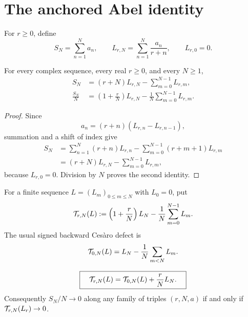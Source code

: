 \section{The anchored Abel identity}
\label{sec:anchored-identity}

\begin{definition}
\label{def:translated-primitive}
For \(r\ge0\), define
\[
 S_N=\sum_{n=1}^Na_n,\qquad
 L_{r,N}=\sum_{n=1}^N\frac{a_n}{r+n},
 \qquad L_{r,0}=0.
\]
\end{definition}

\begin{theorem}
\label{thm:anchored-identity}
For every complex sequence, every real \(r\ge0\), and every
\(N\ge1\),
\begin{align}
 S_N
 &=(r+N)L_{r,N}-\sum_{m=0}^{N-1}L_{r,m},
 \label{eq:anchored-abel}\\
 \frac{S_N}{N}
 &=
 \left(1+\frac rN\right)L_{r,N}
 -\frac1N\sum_{m=0}^{N-1}L_{r,m}.
 \label{eq:anchored-defect-identity}
\end{align}
\end{theorem}

\begin{proof}
Since
\[
 a_n=(r+n)(L_{r,n}-L_{r,n-1}),
\]
summation and a shift of index give
\begin{align*}
 S_N
 &=
 \sum_{n=1}^N(r+n)L_{r,n}
 -\sum_{m=0}^{N-1}(r+m+1)L_{r,m}\\
 &=(r+N)L_{r,N}-\sum_{m=0}^{N-1}L_{r,m},
\end{align*}
because \(L_{r,0}=0\).  Division by \(N\) proves the second
identity.
\end{proof}

\begin{definition}
\label{def:anchored-defect}
For a finite sequence \(L=(L_m)_{0\le m\le N}\) with \(L_0=0\), put
\begin{equation}
 \mathcal T_{r,N}(L)
 :=
 \left(1+\frac rN\right)L_N
 -\frac1N\sum_{m=0}^{N-1}L_m.
 \label{eq:anchored-defect}
\end{equation}
The usual signed backward Ces\`aro defect is
\[
 \mathcal T_{0,N}(L)=L_N-\frac1N\sum_{m<N}L_m.
\]
\end{definition}

\begin{corollary}
\label{cor:translation-cost}
\begin{equation}
 \boxed{\quad
 \mathcal T_{r,N}(L)
 =\mathcal T_{0,N}(L)+\frac rN L_N.
 \quad}
\label{eq:translation-cost}
\end{equation}
Consequently \(S_N/N\to0\) along any family of triples
\((r,N,a)\) if and only if \(\mathcal T_{r,N}(L_r)\to0\).
\end{corollary}

